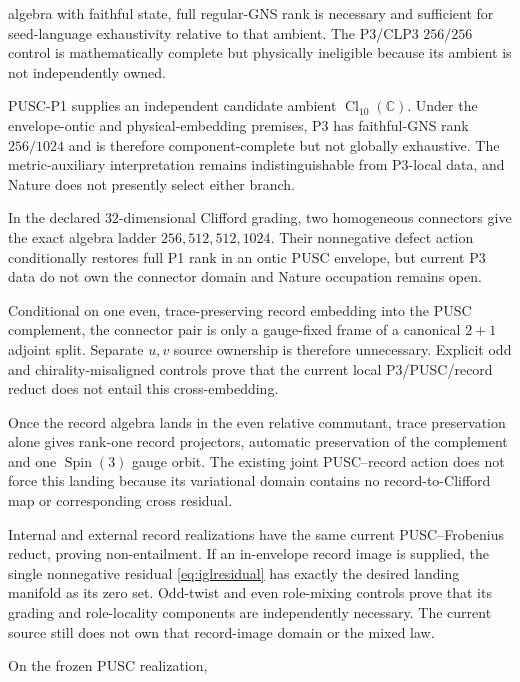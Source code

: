 \documentclass[11pt,a4paper]{article}
\theoremstyle{remark}
\begin{document}
\begin{description}
 algebra with faithful state, full regular-GNS rank is necessary and sufficient
 for seed-language exhaustivity relative to that ambient.  The P3/CLP3
 $256/256$ control is mathematically complete but physically ineligible
 because its ambient is not independently owned.
 \item[Pre-body separator.] PUSC-P1 supplies an independent
 candidate ambient $\operatorname{Cl}_{10}(\mathbb C)$.  Under the
 envelope-ontic and physical-embedding premises, P3 has faithful-GNS rank
 $256/1024$ and is therefore component-complete but not globally exhaustive.
 The metric-auxiliary interpretation remains indistinguishable from P3-local
 data, and Nature does not presently select either branch.
 \item[Connector completion.] In the declared $32$-dimensional Clifford
 grading, two homogeneous connectors give the exact algebra ladder
 $256,512,512,1024$.  Their nonnegative defect action conditionally restores
 full P1 rank in an ontic PUSC envelope, but current P3 data do not own the
 connector domain and Nature occupation remains open.
 \item[Record--Clifford reduction.] Conditional on one even,
 trace-preserving record embedding into the PUSC complement, the connector
 pair is only a gauge-fixed frame of a canonical $2+1$ adjoint split.  Separate
 $u,v$ source ownership is therefore unnecessary.  Explicit odd and
 chirality-misaligned controls prove that the current local P3/PUSC/record
 reduct does not entail this cross-embedding.
 \item[Landing-orbit reduction.] Once the record algebra lands in the even
 relative commutant, trace preservation alone gives rank-one record
 projectors, automatic preservation of the complement and one
 $\operatorname{Spin}(3)$ gauge orbit.  The existing joint PUSC--record
 action does not force this landing because its variational domain contains
 no record-to-Clifford map or corresponding cross residual.
 \item[Internal-graded-locality completion.] Internal and external
 record realizations have the same current PUSC--Frobenius reduct, proving
 non-entailment.  If an in-envelope record image is supplied, the single
 nonnegative residual \eqref{eq:iglresidual} has exactly the desired landing
 manifold as its zero set.  Odd-twist and even role-mixing controls prove that
 its grading and role-locality components are independently necessary.  The
 current source still does not own that record-image domain or the mixed law.
 \item[Joint-representation reduction.] On the frozen PUSC realization,

\end{description}
\end{document}
